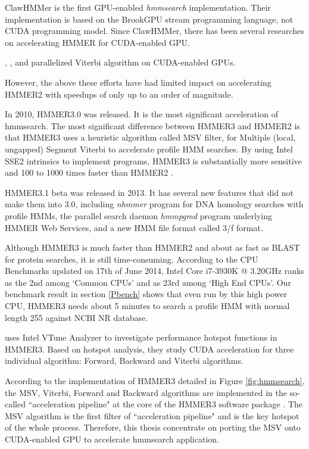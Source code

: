 ClawHMMer \citep{ClawHMMER} is the first GPU-enabled \emph{hmmsearch} implementation. Their implementation is based on the BrookGPU stream programming language, not CUDA programming model. Since ClawHMMer, there has been several researches on accelerating HMMER for CUDA-enabled GPU.

\citep{GPUHMM}, \citep{Ganesan}, \citep{Du} and \citep{Quirem} parallelized Viterbi algorithm on CUDA-enabled GPUs.

However, the above these efforts have had limited impact on accelerating HMMER2 with speedups of only up to an order of magnitude.

In 2010, HMMER3.0 was released. It is the most significant acceleration of hmmsearch. The most significant difference between HMMER3 and HMMER2 is that HMMER3 uses a heuristic algorithm called MSV filter, for Multiple (local, ungapped) Segment Viterbi to accelerate profile HMM searches. By using Intel SSE2 intrinsics to implement programs, HMMER3 is substantially more sensitive and 100 to 1000 times faster than HMMER2 \citep{HMMER3}.

HMMER3.1 beta was released in 2013. It has several new features that did not make them into 3.0, including \emph{nhmmer} program for DNA homology searches with profile HMMs, the parallel search daemon \emph{hmmpgmd} program underlying HMMER Web Services, and a new HMM file format called 3/f format.

Although HMMER3 is much faster than HMMER2 and about as fast as BLAST for protein searches, it is still time-consuming. According to the CPU Benchmarks \citep{cpus} updated on 17th of June 2014, Intel Core i7-3930K @ 3.20GHz ranks as the 2nd among `Common CPUs' and as 23rd among `High End CPUs'. Our benchmark result in section \ref{Pbench} shows that even run by this high power CPU, HMMER3 needs about 5 minutes to search a profile HMM with normal length 255 against NCBI NR database.

\citep{Ahmed} uses Intel VTune Analyzer \citep{Intel} to investigate performance hotspot functions in HMMER3. Based on hotspot analysis, they study CUDA acceleration for three individual algorithm: Forward, Backward and Viterbi algorithms.

According to the implementation of HMMER3 detailed in Figure \ref{fig:hmmsearch}, the MSV, Viterbi, Forward and Backward algorithms are implemented in the so-called ``acceleration pipeline" at the core of the HMMER3 software package \citep{HMMER3}. The MSV algorithm is the first filter of ``acceleration pipeline" and is the key hotspot of the whole process. Therefore, this thesis concentrate on porting the MSV onto CUDA-enabled GPU to accelerate hmmsearch application.

